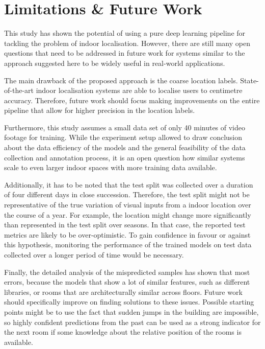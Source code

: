 \documentclass[a4paper]{article}
\begin{document}


\section{Limitations \& Future Work} %
\label{sec:discussion}

This study has shown the potential of using a pure deep learning pipeline for
tackling the problem of indoor localisation. However, there are still many
open questions that need to be addressed in future work for systems similar to
the approach suggested here to be widely useful in real-world applications.

The main drawback of the proposed approach is the coarse location labels.
State-of-the-art indoor localisation systems are able to localise users to
centimetre accuracy. Therefore, future work should focus making improvements
on the entire pipeline that allow for higher precision in the location labels.

Furthermore, this study assumes a small data set of only 40 minutes of video
footage for training. While the experiment setup allowed to draw conclusion
about the data efficiency of the models and the general feasibility of the
data collection and annotation process, it is an open question how similar
systems scale to even larger indoor spaces with more training data available.

Additionally, it has to be noted that the test split was collected over a
duration of four different days in close succession. Therefore, the test split
might not be representative of the true variation of visual inputs from a
indoor location over the course of a year. For example, the location might
change more significantly than represented in the test split over seasons.
In that case, the reported test metrics are likely to be over-optimistic. To
gain confidence in favour or against this hypothesis, monitoring the
performance of the trained models on test data collected over a longer period
of time would be necessary.

Finally, the detailed analysis of the mispredicted samples has shown that
most errors, because the models that show a lot of similar features, such as
different libraries, or rooms that are architecturally similar across floors.
Future work should specifically improve on finding solutions to these issues.
Possible starting points might be to use the fact that sudden jumps in the
building are impossible, so highly confident predictions from the past can be
used as a strong indicator for the next room if some knowledge about the
relative position of the rooms is available.
\end{document}
